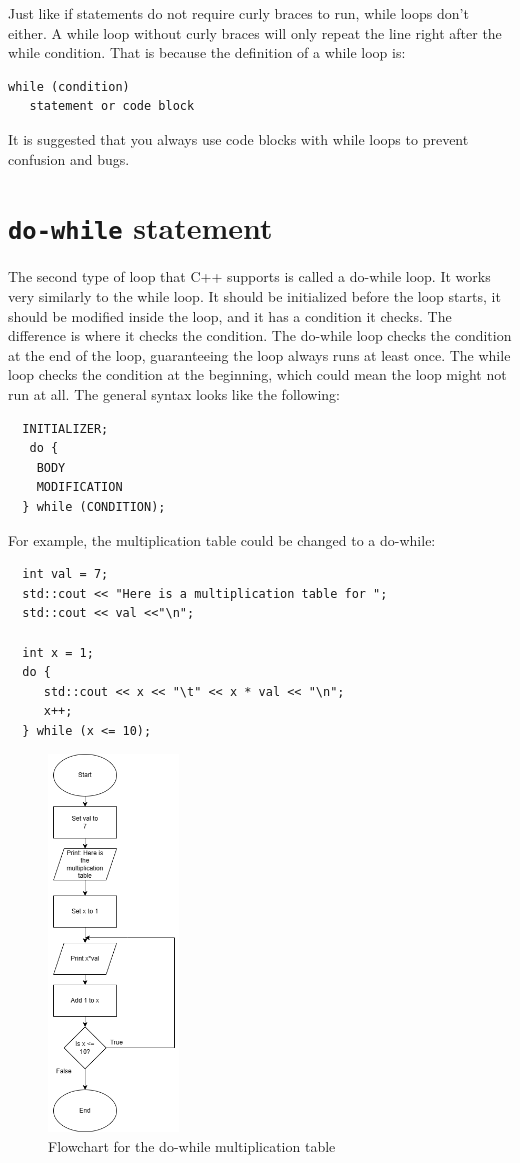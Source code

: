 Just like if statements do not require curly braces to run, while loops don't either. A while loop without curly braces will only repeat the line right after the while condition. That is because the definition of a while loop is:

\begin{verbatim}
while (condition)
   statement or code block
\end{verbatim}

It is suggested that you always use code blocks with while loops to
prevent confusion and bugs.
\section{{\tt do-while} statement}
The second type of loop that C++ supports is called a do-while loop.
It works very similarly to the while loop. It should be initialized
before the loop starts, it should be modified inside the loop, and
it has a condition it checks. The difference is where it checks the
condition. The do-while loop checks the condition at the end of the
loop, guaranteeing the loop always runs at least once. The while loop
checks the condition at the beginning, which could mean the loop
might not run at all. The general syntax looks like the following:

\begin{verbatim}
  INITIALIZER;
   do {
    BODY
    MODIFICATION
  } while (CONDITION);
\end{verbatim}
%

For example, the multiplication table could be changed to a do-while:
\begin{lstlisting}
  int val = 7;
  std::cout << "Here is a multiplication table for ";
  std::cout << val <<"\n";
  
  int x = 1;
  do {
     std::cout << x << "\t" << x * val << "\n";
     x++;
  } while (x <= 10);
\end{lstlisting}
\begin{figure}[h]
    \centering
    \includegraphics[height=10cm]{images/do-whileflow.png}
    \caption{Flowchart for the do-while multiplication table}
    \label{fig:do-while}
\end{figure}


